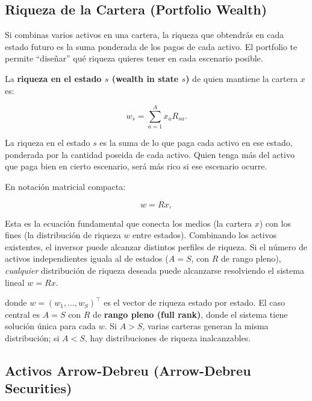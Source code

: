 \documentclass[12pt]{article}
\begin{document}
\subsection{Riqueza de la Cartera (Portfolio Wealth)}

\begin{intuicion}
Si combinas varios activos en una cartera, la riqueza que obtendr\'as en cada estado futuro es la suma ponderada de los pagos de cada activo. El portfolio te permite ``dise\~nar'' qu\'e riqueza quieres tener en cada escenario posible.
\end{intuicion}

La \textbf{riqueza en el estado $s$ (wealth in state $s$)} de quien mantiene la cartera $x$ es:

\begin{equation}
  w_s = \sum_{a=1}^{A} x_a R_{sa}.
\end{equation}

\begin{intuicionmat}
La riqueza en el estado $s$ es la suma de lo que paga cada activo en ese estado, ponderada por la cantidad poseida de cada activo. Quien tenga m\'as del activo que paga bien en cierto escenario, ser\'a m\'as rico si ese escenario ocurre.
\end{intuicionmat}

En notaci\'on matricial compacta:

\begin{equation}
  w = Rx,
\end{equation}

\begin{intuicionmat}
Esta es la ecuaci\'on fundamental que conecta los medios (la cartera $x$) con los fines (la distribuci\'on de riqueza $w$ entre estados). Combinando los activos existentes, el inversor puede alcanzar distintos perfiles de riqueza. Si el n\'umero de activos independientes iguala al de estados ($A = S$, con $R$ de rango pleno), \textit{cualquier} distribuci\'on de riqueza deseada puede alcanzarse resolviendo el sistema lineal $w = Rx$.
\end{intuicionmat}

donde $w = (w_1, \ldots, w_S)^\top$ es el vector de riqueza estado por estado. El caso central es $A = S$ con $R$ de \textbf{rango pleno (full rank)}, donde el sistema tiene soluci\'on \'unica para cada $w$. Si $A > S$, varias carteras generan la misma distribuci\'on; si $A < S$, hay distribuciones de riqueza inalcanzables.

\subsection{Activos Arrow-Debreu (Arrow-Debreu Securities)}
\end{document}
